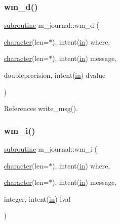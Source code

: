 \subsubsection{\texorpdfstring{wm\+\_\+d()}{wm\_d()}}
{\footnotesize\ttfamily \hyperlink{M__stopwatch_83_8txt_acfbcff50169d691ff02d4a123ed70482}{subroutine} m\+\_\+journal\+::wm\+\_\+d (\begin{DoxyParamCaption}\item[{\hyperlink{option__stopwatch_83_8txt_abd4b21fbbd175834027b5224bfe97e66}{character}(len=$\ast$), intent(\hyperlink{M__journal_83_8txt_afce72651d1eed785a2132bee863b2f38}{in})}]{where,  }\item[{\hyperlink{option__stopwatch_83_8txt_abd4b21fbbd175834027b5224bfe97e66}{character}(len=$\ast$), intent(\hyperlink{M__journal_83_8txt_afce72651d1eed785a2132bee863b2f38}{in})}]{message,  }\item[{doubleprecision, intent(\hyperlink{M__journal_83_8txt_afce72651d1eed785a2132bee863b2f38}{in})}]{dvalue }\end{DoxyParamCaption})\hspace{0.3cm}{\ttfamily [private]}}



References write\+\_\+msg().

\mbox{\label{namespacem__journal_a931487b48fc9268afb0c286c3c3892ad}} 
\subsubsection{\texorpdfstring{wm\+\_\+i()}{wm\_i()}}
{\footnotesize\ttfamily \hyperlink{M__stopwatch_83_8txt_acfbcff50169d691ff02d4a123ed70482}{subroutine} m\+\_\+journal\+::wm\+\_\+i (\begin{DoxyParamCaption}\item[{\hyperlink{option__stopwatch_83_8txt_abd4b21fbbd175834027b5224bfe97e66}{character}(len=$\ast$), intent(\hyperlink{M__journal_83_8txt_afce72651d1eed785a2132bee863b2f38}{in})}]{where,  }\item[{\hyperlink{option__stopwatch_83_8txt_abd4b21fbbd175834027b5224bfe97e66}{character}(len=$\ast$), intent(\hyperlink{M__journal_83_8txt_afce72651d1eed785a2132bee863b2f38}{in})}]{message,  }\item[{integer, intent(\hyperlink{M__journal_83_8txt_afce72651d1eed785a2132bee863b2f38}{in})}]{ival }\end{DoxyParamCaption})\hspace{0.3cm}{\ttfamily [private]}}



